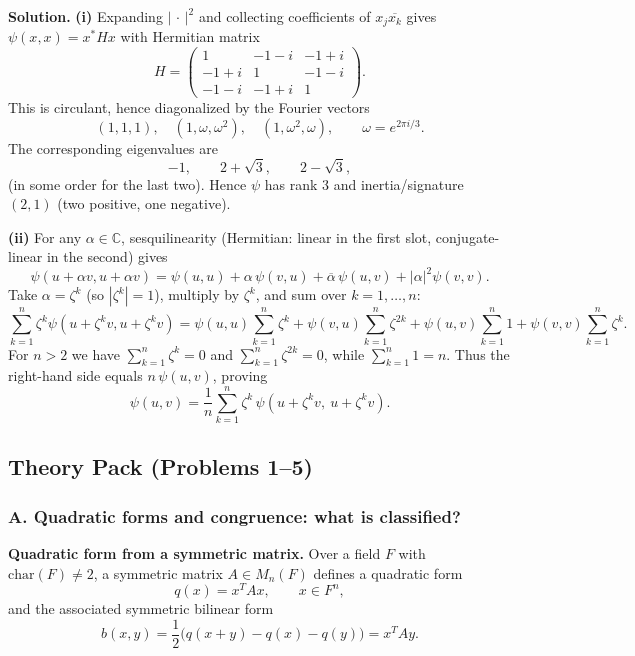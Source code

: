 \documentclass[12pt,a4paper]{article}
\theoremstyle{plain}
\theoremstyle{definition}      %
\begin{document}
\textbf{Solution.}
\textbf{(i)} Expanding $|\,\cdot\,|^2$ and collecting coefficients of $x_j\overline{x_k}$ gives $\psi(x,x)=x^*Hx$ with Hermitian matrix
\[
H=\begin{pmatrix}
	1&-1-i&-1+i\\
	-1+i&1&-1-i\\
	-1-i&-1+i&1
\end{pmatrix}.
\]
This is circulant, hence diagonalized by the Fourier vectors
\[
(1,1,1),\quad (1,\omega,\omega^2),\quad (1,\omega^2,\omega),\qquad \omega=e^{2\pi i/3}.
\]
The corresponding eigenvalues are
\[
-1,\qquad 2+\sqrt3,\qquad 2-\sqrt3,
\]
(in some order for the last two). Hence $\psi$ has rank $3$ and inertia/signature $(2,1)$ (two positive, one negative).

\textbf{(ii)} For any $\alpha\in\mathbb C$, sesquilinearity (Hermitian: linear in the first slot, conjugate-linear in the second) gives
\[
\psi(u+\alpha v,u+\alpha v)=\psi(u,u)+\alpha\,\psi(v,u)+\overline{\alpha}\,\psi(u,v)+|\alpha|^2\psi(v,v).
\]
Take $\alpha=\zeta^k$ (so $|\zeta^k|=1$), multiply by $\zeta^k$, and sum over $k=1,\dots,n$:
\[
\sum_{k=1}^n \zeta^k\psi(u+\zeta^k v,u+\zeta^k v)
=
\psi(u,u)\sum_{k=1}^n \zeta^k
+\psi(v,u)\sum_{k=1}^n \zeta^{2k}
+\psi(u,v)\sum_{k=1}^n 1
+\psi(v,v)\sum_{k=1}^n \zeta^k.
\]
For $n>2$ we have $\sum_{k=1}^n\zeta^k=0$ and $\sum_{k=1}^n\zeta^{2k}=0$, while $\sum_{k=1}^n 1=n$.
Thus the right-hand side equals $n\,\psi(u,v)$, proving
\[
\psi(u,v)=\frac1n\sum_{k=1}^n \zeta^k\,\psi(u+\zeta^k v,\ u+\zeta^k v).
\]



\subsection*{Theory Pack (Problems 1--5)}

\subsubsection*{A. Quadratic forms and congruence: what is classified?}

\textbf{Quadratic form from a symmetric matrix.}
Over a field $F$ with $\mathrm{char}(F)\neq 2$, a symmetric matrix $A\in M_n(F)$ defines a quadratic form
\[
q(x)=x^T A x,\qquad x\in F^n,
\]
and the associated symmetric bilinear form
\[
b(x,y)=\frac12\bigl(q(x+y)-q(x)-q(y)\bigr)=x^T A y.
\]
\end{document}
